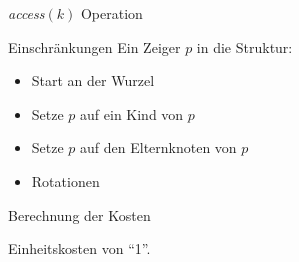 \documentclass[11pt]{beamer}
\begin{document}
\begin{frame} {	\textit{access}$\left(k\right)$ Operation}
	\begin{block}{Einschränkungen}
		Ein Zeiger $p$ in die Struktur:
		\begin{itemize}
			\item Start an der Wurzel  
			\item Setze $p$ auf ein Kind von $p$ 
			\item Setze $p$ auf den Elternknoten von $p$ 
			\item Rotationen 
		\end{itemize}	
	\end{block}	
    \pause 
		\begin{block}{Berechnung der Kosten}
		
		Einheitskosten von \enquote{1}.
	\end{block}	    	
\end{frame}	    
    
		
\end{document}
